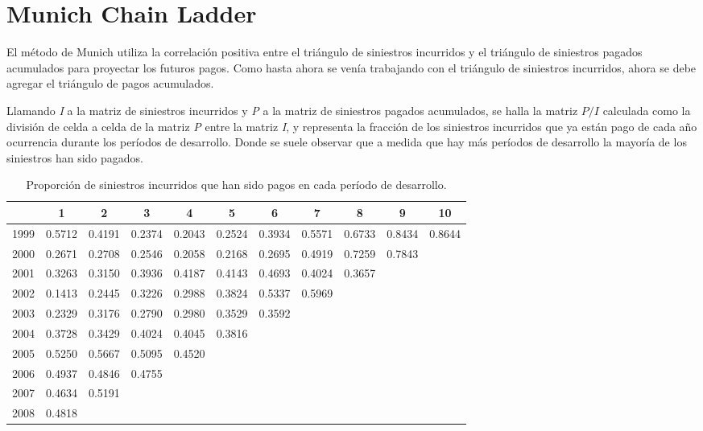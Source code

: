 \documentclass[
  12pt,
]{article}
\begin{document}
\newpage

\hypertarget{munich-chain-ladder}{%
\section{Munich Chain Ladder}\label{munich-chain-ladder}}

El método de Munich utiliza la correlación positiva entre el triángulo
de siniestros incurridos y el triángulo de siniestros pagados acumulados
para proyectar los futuros pagos. Como hasta ahora se venía trabajando
con el triángulo de siniestros incurridos, ahora se debe agregar el
triángulo de pagos acumulados.

Llamando \emph{I} a la matriz de siniestros incurridos y \emph{P} a la
matriz de siniestros pagados acumulados, se halla la matriz \(P/I\)
calculada como la división de celda a celda de la matriz \emph{P} entre
la matriz \emph{I}, y representa la fracción de los siniestros
incurridos que ya están pago de cada año ocurrencia durante los períodos
de desarrollo. Donde se suele observar que a medida que hay más períodos
de desarrollo la mayoría de los siniestros han sido pagados.

\begin{table}[ht]
\centering
\caption{Proporción de siniestros incurridos que han sido pagos en cada período de desarrollo.} 
\label{tabla2}
\begingroup\fontsize{11.5pt}{10pt}\selectfont
\begin{tabular}{ccccccccccc}
  \hline
 & 1 & 2 & 3 & 4 & 5 & 6 & 7 & 8 & 9 & 10 \\ 
  \hline
1999 & 0.5712 & 0.4191 & 0.2374 & 0.2043 & 0.2524 & 0.3934 & 0.5571 & 0.6733 & 0.8434 & 0.8644 \\ 
  2000 & 0.2671 & 0.2708 & 0.2546 & 0.2058 & 0.2168 & 0.2695 & 0.4919 & 0.7259 & 0.7843 &  \\ 
  2001 & 0.3263 & 0.3150 & 0.3936 & 0.4187 & 0.4143 & 0.4693 & 0.4024 & 0.3657 &  &  \\ 
  2002 & 0.1413 & 0.2445 & 0.3226 & 0.2988 & 0.3824 & 0.5337 & 0.5969 &  &  &  \\ 
  2003 & 0.2329 & 0.3176 & 0.2790 & 0.2980 & 0.3529 & 0.3592 &  &  &  &  \\ 
  2004 & 0.3728 & 0.3429 & 0.4024 & 0.4045 & 0.3816 &  &  &  &  &  \\ 
  2005 & 0.5250 & 0.5667 & 0.5095 & 0.4520 &  &  &  &  &  &  \\ 
  2006 & 0.4937 & 0.4846 & 0.4755 &  &  &  &  &  &  &  \\ 
  2007 & 0.4634 & 0.5191 &  &  &  &  &  &  &  &  \\ 
  2008 & 0.4818 &  &  &  &  &  &  &  &  &  \\ 
   \hline
\end{tabular}
\endgroup
\end{table}
\end{document}
